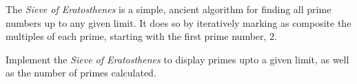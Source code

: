 

\problem The {\em Sieve of Eratosthenes} is a simple, ancient algorithm for finding all prime numbers up to any given limit.
It does so by iteratively marking as composite the multiples of each prime, starting with the first prime number, $2$.

Implement the {\em Sieve of Eratosthenes} to display primes upto a given limit, as well as the number of primes calculated.

\solution

\sourcecode

